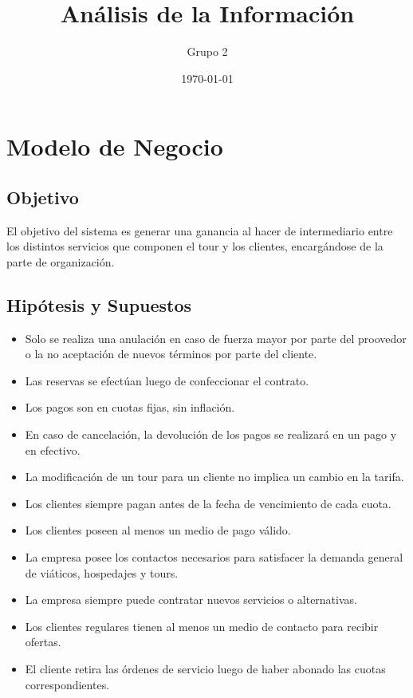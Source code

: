 \documentclass[12pt,a4paper]{article}
\title{Análisis de la Información}
\author{
        Grupo 2
}
\date{\today}
\begin{document}
%


\maketitle\thispagestyle{empty}

\newpage\null\thispagestyle{empty}\newpage

\newpage
\tableofcontents

\newpage\null\thispagestyle{empty}\newpage

\section{Modelo de Negocio}
	\subsection{Objetivo}
		El objetivo del sistema es generar una ganancia al hacer de intermediario entre los distintos servicios que componen el tour y los clientes, encargándose de la parte de organización.

	\subsection{Hipótesis y Supuestos}
		\begin{itemize}
			\item Solo se realiza una anulación en caso de fuerza mayor por parte del proovedor o la no aceptación de nuevos términos por parte del cliente.
			\item Las reservas se efectúan luego de confeccionar el contrato.
			\item Los pagos son en cuotas fijas, sin inflación.
			\item En caso de cancelación, la devolución de los pagos se realizará en un pago y en efectivo.
			\item La modificación de un tour para un cliente no implica un cambio en la tarifa.
			\item Los clientes siempre pagan antes de la fecha de vencimiento de cada cuota.
			\item Los clientes poseen al menos un medio de pago válido.
			\item La empresa posee los contactos necesarios para satisfacer la demanda general de viáticos, hospedajes y tours.
			\item La empresa siempre puede contratar nuevos servicios o alternativas.
			\item Los clientes regulares tienen al menos un medio de contacto para recibir ofertas.
			\item El cliente retira las órdenes de servicio luego de haber abonado las cuotas correspondientes.
		\end{itemize}
\end{document}
